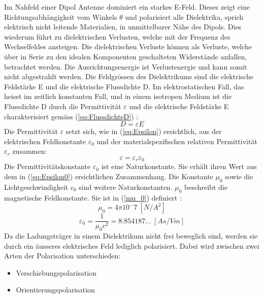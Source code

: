 
Im Nahfeld einer Dipol Antenne dominiert ein starkes E-Feld. Dieses zeigt eine Richtungsabhängigkeit vom Winkels $\theta$ und polarisiert alle Dielektrika, sprich elektrisch nicht leitende Materialien, in unmittelbarer Nähe des Dipols. Dies wiederum führt zu dielektrischen Verlusten, welche mit der Frequenz des Wechselfeldes ansteigen. Die dielektrischen Verluste können als Verluste, welche über in Serie zu den idealen Komponenten geschalteten Widerstände anfallen, betrachtet werden. Die Ausrichtungsenergie ist Verlustenergie und kann somit nicht abgestrahlt werden. Die Feldgrössen des Dielektrikums sind die elektrische Feldstärke E und die elektrische Flussdichte D. Im elektrostatischen Fall, das heisst im zeitlich konstanten Fall, und in einem isotropen Medium ist die Flussdichte D durch die Permittivität $\varepsilon $ und die elektrische Feldstärke E charakterisiert gemäss (\ref{eq:FlussdichteD}) \cite{Emant}:
\begin{equation}\label{eq:FlussdichteD}
D=\varepsilon E
\end{equation}
Die Permittivität $\varepsilon$ setzt sich, wie in (\ref{eq:Epsilon}) ersichtlich, aus der elektrischen Feldkonstante $\varepsilon_0$ und der materialspezifischen relativen Permittivität $\varepsilon_r$ zusammen:
\begin{equation}\label{eq:Epsilon}
\varepsilon = \varepsilon_r \varepsilon_0
\end{equation}
Die Permittivitätskonstante $\varepsilon_{0}$ ist eine Naturkonstante. Sie erhält ihren Wert aus dem in (\ref{eq:Epsilon0}) ersichtlichen Zusammenhang. Die Konstante $\mu_{0}$ sowie die Lichtgeschwindigkeit $c_0$ sind weitere  Naturkonstanten. $\mu_{0}$ beschreibt die magnetische Feldkonstante. Sie ist in (\ref{mu_0}) definiert \cite {WikiPermitt}: 
\begin{equation}\label{mu_0}
\mu_{0}=4\pi10^-7  \ [N/A^{2}] 
\end{equation}
\begin{equation}\label{eq:Epsilon0}
\varepsilon_{0} = \dfrac{1}{\mu_{0}c^{2}}=8.854187... \  [As/Vm]
\end{equation}
Da die Ladungsträger in einem Dielektrikum nicht frei beweglich sind, werden sie durch ein äusseres elektrisches Feld lediglich polarisiert. Dabei wird zwischen zwei Arten der Polarisation unterschieden:
\begin{itemize}
\item Verschiebungspolarisation
\item Orientierungspolarisation
\end{itemize}
